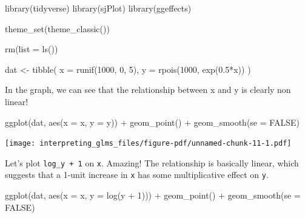 \documentclass[
  letterpaper,
  DIV=11,
  numbers=noendperiod]{scrreprt}
\newenvironment{Shaded}{}{}
\newcommand{\AttributeTok}[1]{\textcolor[rgb]{0.49,0.56,0.16}{#1}}
\newcommand{\ConstantTok}[1]{\textcolor[rgb]{0.53,0.00,0.00}{#1}}
\newcommand{\DecValTok}[1]{\textcolor[rgb]{0.25,0.63,0.44}{#1}}
\newcommand{\FloatTok}[1]{\textcolor[rgb]{0.25,0.63,0.44}{#1}}
\newcommand{\FunctionTok}[1]{\textcolor[rgb]{0.02,0.16,0.49}{#1}}
\newcommand{\NormalTok}[1]{#1}
\newcommand{\OtherTok}[1]{\textcolor[rgb]{0.00,0.44,0.13}{#1}}
\newcommand{\SpecialCharTok}[1]{\textcolor[rgb]{0.25,0.44,0.63}{#1}}
\begin{document}
\begin{Shaded}
\begin{Highlighting}[]
\FunctionTok{library}\NormalTok{(tidyverse)}
\FunctionTok{library}\NormalTok{(sjPlot)}
\FunctionTok{library}\NormalTok{(ggeffects)}

\FunctionTok{theme\_set}\NormalTok{(}\FunctionTok{theme\_classic}\NormalTok{())}

\FunctionTok{rm}\NormalTok{(}\AttributeTok{list =} \FunctionTok{ls}\NormalTok{())}

\NormalTok{dat }\OtherTok{\textless{}{-}} \FunctionTok{tibble}\NormalTok{(}
  \AttributeTok{x =} \FunctionTok{runif}\NormalTok{(}\DecValTok{1000}\NormalTok{, }\DecValTok{0}\NormalTok{, }\DecValTok{5}\NormalTok{),}
  \AttributeTok{y =} \FunctionTok{rpois}\NormalTok{(}\DecValTok{1000}\NormalTok{, }\FunctionTok{exp}\NormalTok{(}\FloatTok{0.5}\SpecialCharTok{*}\NormalTok{x))}
\NormalTok{)}
\end{Highlighting}
\end{Shaded}

In the graph, we can see that the relationship between x and y is
clearly non linear!

\begin{Shaded}
\begin{Highlighting}[]
\FunctionTok{ggplot}\NormalTok{(dat, }\FunctionTok{aes}\NormalTok{(}\AttributeTok{x =}\NormalTok{ x, }\AttributeTok{y =}\NormalTok{ y)) }\SpecialCharTok{+}
  \FunctionTok{geom\_point}\NormalTok{() }\SpecialCharTok{+}
  \FunctionTok{geom\_smooth}\NormalTok{(}\AttributeTok{se =} \ConstantTok{FALSE}\NormalTok{)}
\end{Highlighting}
\end{Shaded}

\texttt{[image: interpreting\_glms\_files/figure-pdf/unnamed-chunk-11-1.pdf]}

Let's plot \texttt{log\_y\ +\ 1} on \texttt{x}. Amazing! The
relationship is basically linear, which suggests that a 1-unit increase
in \texttt{x} has some multiplicative effect on \texttt{y}.

\begin{Shaded}
\begin{Highlighting}[]
\FunctionTok{ggplot}\NormalTok{(dat, }\FunctionTok{aes}\NormalTok{(}\AttributeTok{x =}\NormalTok{ x, }\AttributeTok{y =} \FunctionTok{log}\NormalTok{(y }\SpecialCharTok{+} \DecValTok{1}\NormalTok{))) }\SpecialCharTok{+}
  \FunctionTok{geom\_point}\NormalTok{() }\SpecialCharTok{+}
  \FunctionTok{geom\_smooth}\NormalTok{(}\AttributeTok{se =} \ConstantTok{FALSE}\NormalTok{)}
\end{Highlighting}
\end{Shaded}
\end{document}
